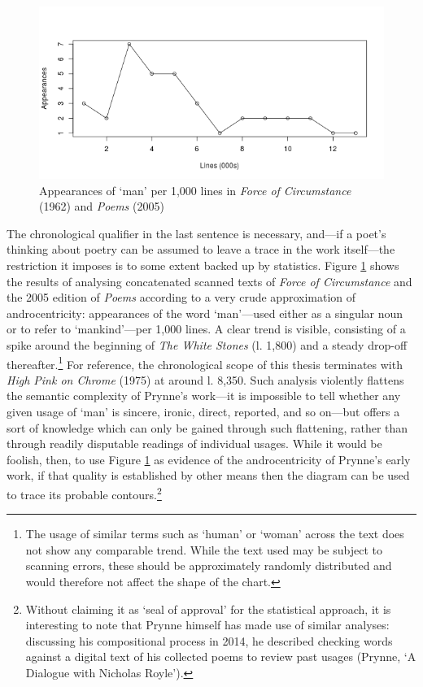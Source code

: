 \documentclass[]{article}
\begin{document}
\begin{figure}[t]
\centering
\includegraphics{figs/man.png}
\caption{Appearances of `man' per 1,000 lines in \emph{Force of
Circumstance} (1962) and \emph{Poems} (2005)\label{fig:man}}
\end{figure}

The chronological qualifier in the last sentence is necessary, and---if
a poet's thinking about poetry can be assumed to leave a trace in the
work itself---the restriction it imposes is to some extent backed up by
statistics. Figure \ref{fig:man} shows the results of analysing
concatenated scanned texts of \emph{Force of Circumstance} and the 2005
edition of \emph{Poems} according to a very crude approximation of
androcentricity: appearances of the word `man'---used either as a
singular noun or to refer to `mankind'---per 1,000 lines. A clear trend
is visible, consisting of a spike around the beginning of \emph{The
White Stones} (l. 1,800) and a steady drop-off thereafter.\footnote{The
  usage of similar terms such as `human' or `woman' across the text does
  not show any comparable trend. While the text used may be subject to
  scanning errors, these should be approximately randomly distributed
  and would therefore not affect the shape of the chart.} For reference,
the chronological scope of this thesis terminates with \emph{High Pink
on Chrome} (1975) at around l. 8,350. Such analysis violently flattens
the semantic complexity of Prynne's work---it is impossible to tell
whether any given usage of `man' is sincere, ironic, direct, reported,
and so on---but offers a sort of knowledge which can only be gained
through such flattening, rather than through readily disputable readings
of individual usages. While it would be foolish, then, to use Figure
\ref{fig:man} as evidence of the androcentricity of Prynne's early work,
if that quality is established by other means then the diagram can be
used to trace its probable contours.\footnote{Without claiming it as
  `seal of approval' for the statistical approach, it is interesting to
  note that Prynne himself has made use of similar analyses: discussing
  his compositional process in 2014, he described checking words against
  a digital text of his collected poems to review past usages (Prynne,
  `A Dialogue with Nicholas Royle').}
\end{document}
